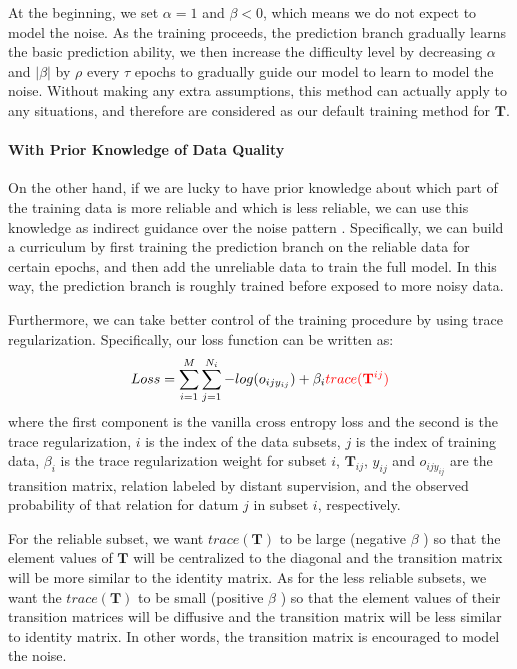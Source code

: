 At the beginning, we set $\alpha=1$ and $\beta<0$, which means we do not expect to model the noise. As the training proceeds, the prediction branch gradually learns the basic prediction ability, we then increase the difficulty level by decreasing $\alpha$ and  $|\beta|$ by $\rho$ every $\tau$ epochs to gradually guide our model to learn to model the noise. Without making any extra assumptions, this method can actually apply to any situations, and therefore are considered as our default training method for $\mathbf{T}$.

\paragraph{With Prior Knowledge of Data Quality}
On the other hand, if we are lucky to have prior knowledge about which part of the training data is more reliable and which is less reliable, we can use this knowledge as indirect guidance over the noise pattern . Specifically, we can build a curriculum by first training the prediction branch on the reliable data for certain epochs, and then add the unreliable data to train the full model. In this way, the prediction branch is roughly trained before exposed to more noisy data.

Furthermore, we can take better control of the training procedure by using trace regularization.
Specifically, our loss function can be written as:
%
\begin{equation}
\begin{aligned}
Loss=\sum_{i=1}^M{\sum_{j=1}^{N_i}{-log(o_{ijy_{ij}})}} + \beta_i \textcolor{red}{trace(\mathbf{T}^{ij})}
\end{aligned}
\end{equation}
where the first component is the vanilla cross entropy loss  and the second is the trace regularization, $i$ is the index of the data subsets, $j$ is the index of training data, $\beta_i$ is the trace regularization weight for subset $i$, $\mathbf{T}_{ij}$, $y_{ij}$ and $o_{ijy_{ij}}$ are the transition matrix, relation labeled by distant supervision, and the observed probability of that relation for datum $j$ in subset $i$, respectively.

For the reliable subset, we want $trace(\mathbf{T})$ to be large (negative $\beta$ ) so that the element values of $\mathbf{T}$ will be centralized to the diagonal and the transition matrix will be more similar to the identity matrix. As for the  less reliable subsets, we want the $trace(\mathbf{T})$ to be small (positive $\beta$ ) so that the element values of their transition matrices will be diffusive and the transition matrix will be less similar to identity matrix. In other words, the transition matrix is encouraged to model the noise. 

